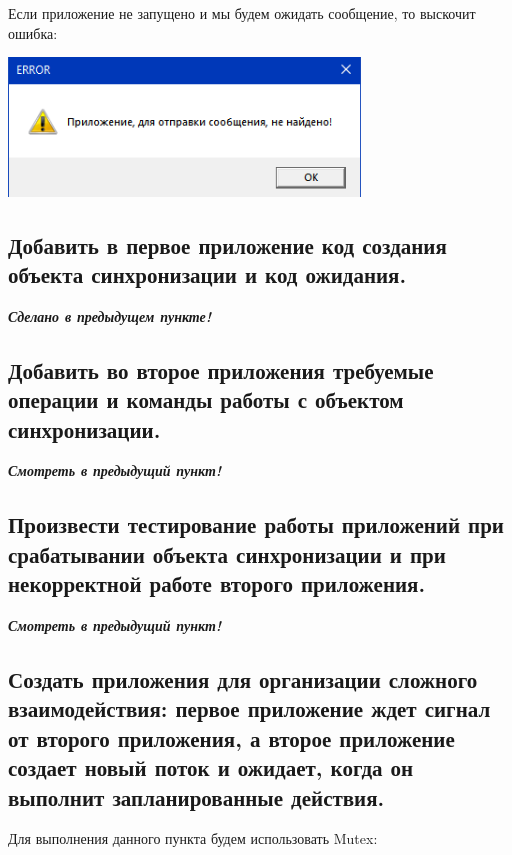 \documentclass[12pt]{article}
\begin{document}
Если приложение не запущено и мы будем ожидать сообщение, то выскочит ошибка:\\

\begin{center}
\includegraphics[width=0.7\textwidth]{assets/5.png}\\
\end{center}

\subsection{Добавить в первое приложение код создания объекта синхронизации и код ожидания.}

\textit{\textbf{Сделано в предыдущем пункте!}}\\
\subsection{Добавить во второе приложения требуемые операции и команды работы с объектом синхронизации.}
\textit{\textbf{Смотреть в предыдущий пункт!}}\\
\subsection{Произвести тестирование работы приложений при срабатывании объекта синхронизации и при некорректной работе второго приложения.}

\textit{\textbf{Смотреть в предыдущий пункт!}}\\
\subsection{Создать приложения для организации сложного взаимодействия: первое приложение ждет сигнал от второго приложения, а второе приложение создает новый поток и ожидает, когда он выполнит запланированные действия.}

Для выполнения данного пункта будем использовать Mutex:\\
\end{document}
